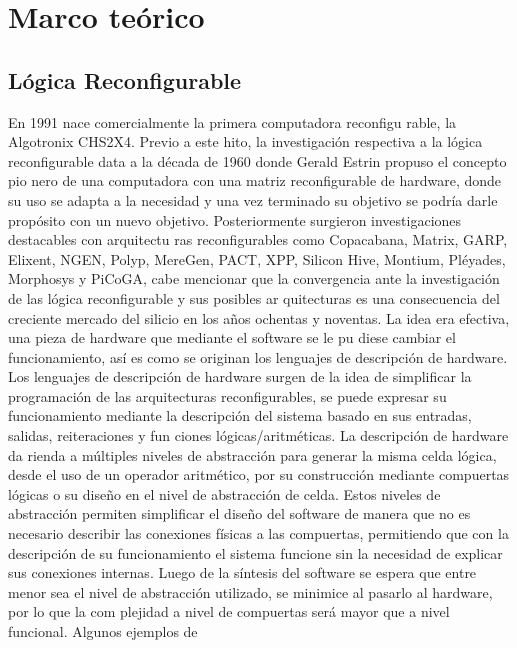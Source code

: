 


\chapter{Marco teórico}
\label{ch:marco}

\section{Lógica Reconfigurable}

En 1991 nace comercialmente la primera computadora reconfigu
rable, la Algotronix CHS2X4. Previo a este hito, la investigación respectiva a la lógica
reconfigurable data a la década de 1960 donde Gerald Estrin propuso el concepto pio
nero de una computadora con una matriz reconfigurable de hardware, donde su uso se
adapta a la necesidad y una vez terminado su objetivo se podría darle propósito con
un nuevo objetivo. Posteriormente surgieron investigaciones destacables con arquitectu
ras reconfigurables como Copacabana, Matrix, GARP, Elixent, NGEN, Polyp, MereGen,
PACT, XPP, Silicon Hive, Montium, Pléyades, Morphosys y PiCoGA, cabe mencionar
que la convergencia ante la investigación de las lógica reconfigurable y sus posibles ar
quitecturas es una consecuencia del creciente mercado del silicio en los años ochentas y
noventas. La idea era efectiva, una pieza de hardware que mediante el software se le pu
diese cambiar el funcionamiento, así es como se originan los lenguajes de descripción de
hardware. Los lenguajes de descripción de hardware surgen de la idea de simplificar la
programación de las arquitecturas reconfigurables, se puede expresar su funcionamiento
mediante la descripción del sistema basado en sus entradas, salidas, reiteraciones y fun
ciones lógicas/aritméticas.  La descripción de hardware da rienda a múltiples niveles de
abstracción para generar la misma celda lógica, desde el uso de un operador aritmético,
por su construcción mediante compuertas lógicas o su diseño en el nivel de abstracción de
celda. Estos niveles de abstracción permiten simplificar el diseño del software de manera
que no es necesario describir las conexiones físicas a las compuertas, permitiendo que con
la descripción de su funcionamiento el sistema funcione sin la necesidad de explicar sus
conexiones internas. Luego de la síntesis del software se espera que entre menor sea el
nivel de abstracción utilizado, se minimice al pasarlo al hardware, por lo que la com
plejidad a nivel de compuertas será mayor que a nivel funcional. Algunos ejemplos de
